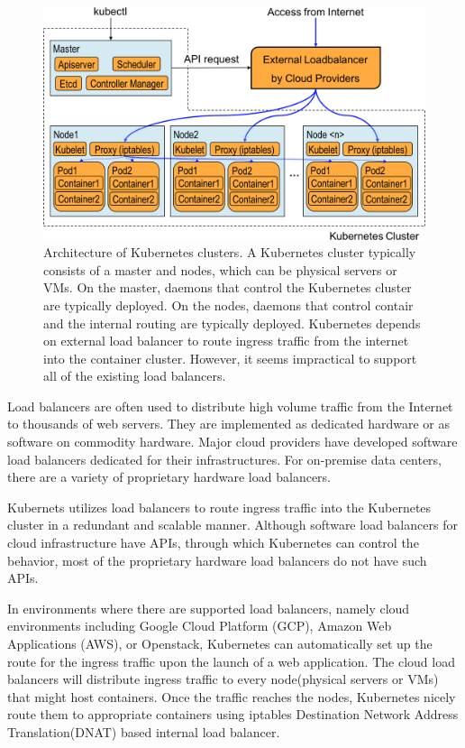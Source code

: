 \begin{figure}[h]
  \centering
  \includegraphics[width=0.8\columnwidth]{Figs/K8sConventional}
  
  \centering
  
  \begin{minipage}{0.9\columnwidth}
    \caption[Architecture of Kubernetes clusters]{
      Architecture of Kubernetes clusters.
      A Kubernetes cluster typically consists of a master and nodes, which can be physical servers or VMs.
      On the master, daemons that control the Kubernetes cluster are typically deployed. 
      On the nodes,  daemons that control contair and the internal routing are typically deployed.
      Kubernetes depends on external load balancer to route ingress traffic from the internet into the container cluster.
      However, it seems impractical to support all of the existing load balancers.
    }
    \label{fig:k8s_intro}
  \end{minipage}
  
\end{figure}

Load balancers are often used to distribute high volume traffic from the Internet to thousands of web servers.
They are implemented as dedicated hardware or as software on commodity hardware.
Major cloud providers have developed software load balancers\cite{eisenbud2016maglev,patel2013ananta} dedicated for their infrastructures.
For on-premise data centers, there are a variety of proprietary hardware load balancers.

Kubernets utilizes load balancers to route ingress traffic into the Kubernetes cluster in a redundant and scalable manner. 
Although software load balancers for cloud infrastructure have APIs, through which Kubernetes can control the behavior, most of the proprietary hardware load balancers do not have such APIs.

In environments where there are supported load balancers, namely cloud environments including Google Cloud Platform (GCP), Amazon Web Applications (AWS), or Openstack, Kubernetes can automatically set up the route for the ingress traffic upon the launch of a web application.
The cloud load balancers will distribute ingress traffic to every node(physical servers or VMs) that might host containers.
Once the traffic reaches the nodes, Kubernetes nicely route them to appropriate containers using iptables Destination Network Address Translation(DNAT) based internal load balancer.

